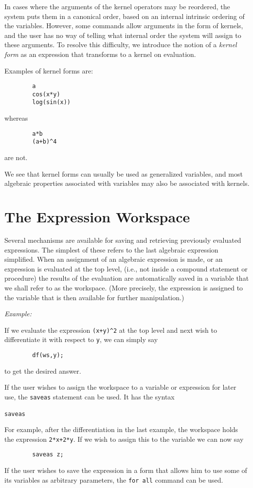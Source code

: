 In cases where the arguments of the kernel operators may be reordered, the
system puts them in a canonical order, based on an internal intrinsic
ordering of the variables. However, some commands allow arguments in the
form of kernels, and the user has no way of telling what internal order the
system will assign to these arguments. To resolve this difficulty, we
introduce the notion of a \emph{kernel form} as an
expression that transforms to a kernel on evaluation.

Examples of kernel forms are:
\begin{verbatim}
        a
        cos(x*y)
        log(sin(x))
\end{verbatim}
whereas
\begin{verbatim}
        a*b
        (a+b)^4
\end{verbatim}
are not.

We see that kernel forms can usually be used as generalized variables, and
most algebraic properties associated with variables may also be associated
with kernels.

\section{The Expression Workspace}\label{Workspace}

Several mechanisms are available for saving and retrieving previously
evaluated expressions.  The simplest of these refers to the last algebraic
expression simplified.  When an assignment of an algebraic expression is
made, or an expression is evaluated at the top level, (i.e., not inside a
compound statement or procedure) the results of the evaluation are
automatically saved in a variable  that we shall refer to as the
workspace. (More precisely, the expression is assigned to the variable
 that is then available for further manipulation.)

\textit{Example:}

If we evaluate the expression \texttt{(x+y)\textasciicircum2} at the top
level and next
wish to differentiate it with respect to \texttt{y}, we can simply say
\begin{verbatim}
        df(ws,y);
\end{verbatim}
to get the desired answer.

\hypertarget{command:SAVEAS}{}
If the user wishes to assign the workspace to a variable or expression for
later use, the \texttt{saveas}
 statement can be used.  It
has the syntax
\begin{syntax}
  \texttt{saveas}\ 
\end{syntax}
For example, after the differentiation in the last example, the workspace
holds the expression \texttt{2*x+2*y}.  If we wish to assign this to the
variable  we can now say
\begin{verbatim}
        saveas z;
\end{verbatim}
If the user wishes to save the expression in a form that allows him to use
some of its variables as arbitrary parameters, the \texttt{for all}
command can be used.


